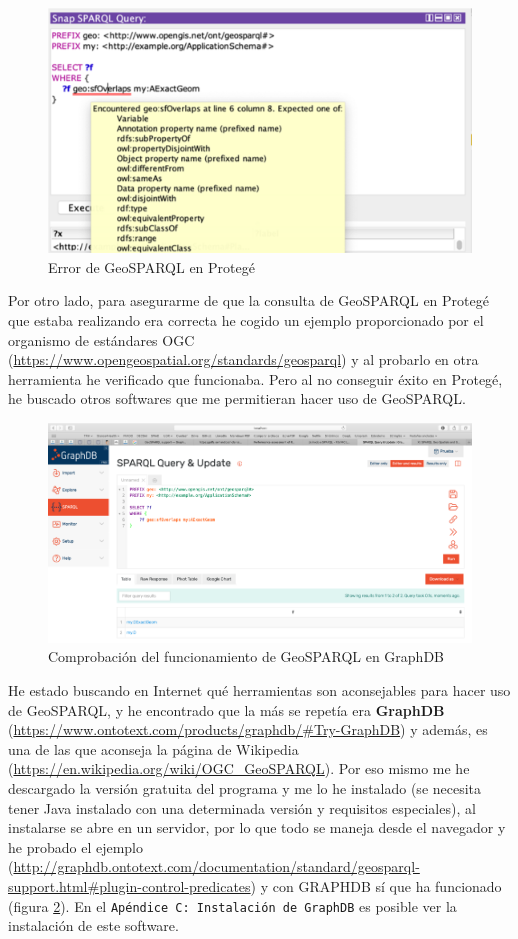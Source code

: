 \begin{figure}[H]
	\centering
	\includegraphics[width=0.8\linewidth]{imagenes/apendices/Imagen2}
	\caption{Error de GeoSPARQL en Protegé}
	\label{fig:imagen2-error}
\end{figure}

Por otro lado, para asegurarme de que la consulta de GeoSPARQL en Protegé que estaba realizando era correcta he cogido un ejemplo proporcionado por el organismo de estándares OGC (\url{https://www.opengeospatial.org/standards/geosparql}) y al probarlo en otra herramienta he verificado que funcionaba. Pero al no conseguir éxito en Protegé, he buscado otros softwares que me permitieran hacer uso de GeoSPARQL.

\begin{figure}[H]
	\centering
	\includegraphics[width=1\linewidth]{imagenes/apendices/Imagen3}
	\caption{Comprobación del funcionamiento de GeoSPARQL en GraphDB}
	\label{fig:imagen3-funciona}
\end{figure}


He estado buscando en Internet qué herramientas son aconsejables para hacer uso de GeoSPARQL, y he encontrado que la más se repetía era \textbf{GraphDB} (\url{https://www.ontotext.com/products/graphdb/#Try-GraphDB}) y además, es una de las que aconseja la página de Wikipedia (\url{https://en.wikipedia.org/wiki/OGC_GeoSPARQL}). Por eso mismo me he descargado la versión gratuita del programa y me lo he instalado (se necesita tener Java instalado con una determinada versión y requisitos especiales), al instalarse se abre en un servidor, por lo que todo se maneja desde el navegador y he probado el ejemplo (\url{http://graphdb.ontotext.com/documentation/standard/geosparql-support.html#plugin-control-predicates}) y con GRAPHDB sí que ha funcionado (figura \ref{fig:imagen3-funciona}). En el \texttt{Apéndice C: Instalación de GraphDB} es posible ver la instalación de este software.\\


